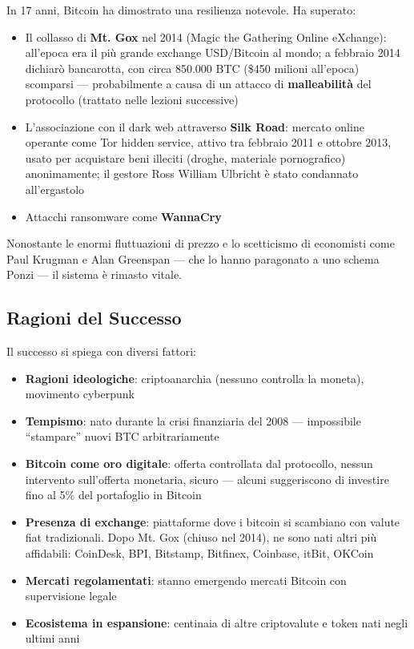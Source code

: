 \documentclass[
  italian,
  openany]{book}
\providecommand{\tightlist}{%
  \setlength{\itemsep}{0pt}\setlength{\parskip}{0pt}}
\begin{document}
In 17 anni, Bitcoin ha dimostrato una resilienza notevole. Ha superato:

\begin{itemize}
\tightlist
\item
  Il collasso di \textbf{Mt. Gox} nel 2014 (Magic the Gathering Online
  eXchange): all'epoca era il più grande exchange USD/Bitcoin al mondo;
  a febbraio 2014 dichiarò bancarotta, con circa 850.000 BTC (\$450
  milioni all'epoca) scomparsi --- probabilmente a causa di un attacco
  di \textbf{malleabilità} del protocollo (trattato nelle lezioni
  successive)
\item
  L'associazione con il dark web attraverso \textbf{Silk Road}: mercato
  online operante come Tor hidden service, attivo tra febbraio 2011 e
  ottobre 2013, usato per acquistare beni illeciti (droghe, materiale
  pornografico) anonimamente; il gestore Ross William Ulbricht è stato
  condannato all'ergastolo
\item
  Attacchi ransomware come \textbf{WannaCry}
\end{itemize}

Nonostante le enormi fluttuazioni di prezzo e lo scetticismo di
economisti come Paul Krugman e Alan Greenspan --- che lo hanno
paragonato a uno schema Ponzi --- il sistema è rimasto vitale.

\subsection{Ragioni del Successo}\label{ragioni-del-successo}

Il successo si spiega con diversi fattori:

\begin{itemize}
\tightlist
\item
  \textbf{Ragioni ideologiche}: criptoanarchia (nessuno controlla la
  moneta), movimento cyberpunk
\item
  \textbf{Tempismo}: nato durante la crisi finanziaria del 2008 ---
  impossibile ``stampare'' nuovi BTC arbitrariamente
\item
  \textbf{Bitcoin come oro digitale}: offerta controllata dal
  protocollo, nessun intervento sull'offerta monetaria, sicuro ---
  alcuni suggeriscono di investire fino al 5\% del portafoglio in
  Bitcoin
\item
  \textbf{Presenza di exchange}: piattaforme dove i bitcoin si scambiano
  con valute fiat tradizionali. Dopo Mt. Gox (chiuso nel 2014), ne sono
  nati altri più affidabili: CoinDesk, BPI, Bitstamp, Bitfinex,
  Coinbase, itBit, OKCoin
\item
  \textbf{Mercati regolamentati}: stanno emergendo mercati Bitcoin con
  supervisione legale
\item
  \textbf{Ecosistema in espansione}: centinaia di altre criptovalute e
  token nati negli ultimi anni
\end{itemize}
\end{document}
